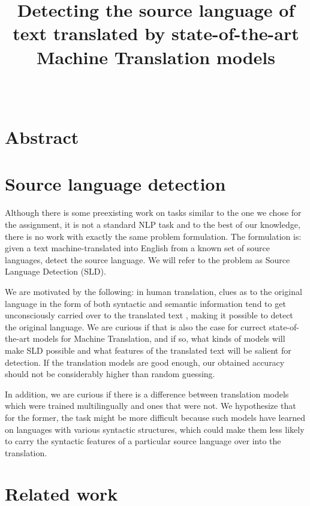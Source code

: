 \documentclass[twocolumn]{article}
\title{{\Huge \textbf{Detecting the source language of text translated by state-of-the-art Machine Translation models}} \\ }
\author{ \\ {\small }}
\date{}
\begin{document}
\maketitle

\section*{Abstract}

\section*{Source language detection}

Although there is some preexisting work on tasks similar to the one we chose for the assignment, it is not a standard NLP task and to the best of our knowledge, there is no work with exactly the same problem formulation. The formulation is: given a text machine-translated into English from a known set of source languages, detect the source language. We will refer to the problem as Source Language Detection (SLD).

We are motivated by the following: in human translation, clues as to the original language in the form of both syntactic and semantic information tend to get unconsciously carried over to the translated text \cite{literary}, making it possible to detect the original language. We are curious if that is also the case for currect state-of-the-art models for Machine Translation, and if so, what kinds of models will make SLD possible and what features of the translated text will be salient for detection. If the translation models are good enough, our obtained accuracy should not be considerably higher than random guessing.

In addition, we are curious if there is a difference between translation models which were trained multilingually and ones that were not. We hypothesize that for the former, the task might be more difficult because such models have learned on languages with various syntactic structures, which could make them less likely to carry the syntactic features of a particular source language over into the translation.


\section*{Related work}
\end{document}

